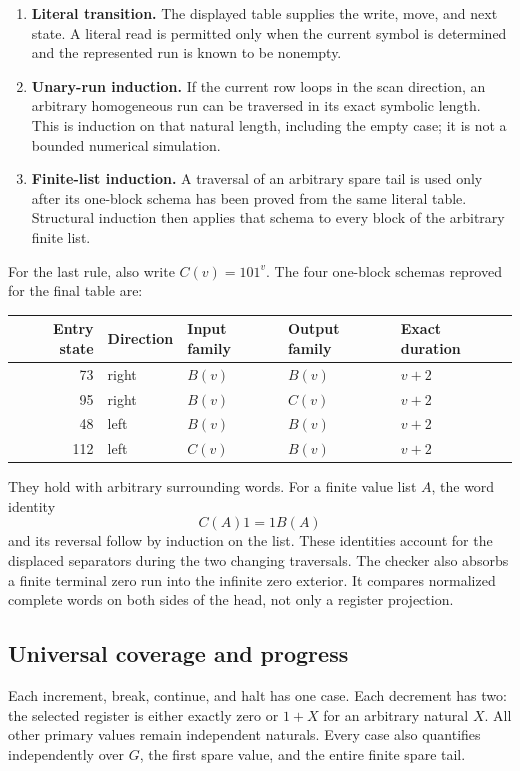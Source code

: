 \begin{enumerate}
\item \textbf{Literal transition.} The displayed table supplies the write,
move, and next state. A literal read is permitted only when the current
symbol is determined and the represented run is known to be nonempty.
\item \textbf{Unary-run induction.} If the current row loops in the scan
direction, an arbitrary homogeneous run can be traversed in its exact
symbolic length. This is induction on that natural length, including the
empty case; it is not a bounded numerical simulation.
\item \textbf{Finite-list induction.} A traversal of an arbitrary spare
tail is used only after its one-block schema has been proved from the
same literal table. Structural induction then applies that schema to
every block of the arbitrary finite list.
\end{enumerate}

For the last rule, also write $C(v)=101^v$. The four one-block schemas
reproved for the final table are:

\begin{center}
\begin{tabular}{rllll}
\toprule
Entry state&Direction&Input family&Output family&Exact duration\\
\midrule
73&right&$B(v)$&$B(v)$&$v+2$\\
95&right&$B(v)$&$C(v)$&$v+2$\\
48&left&$B(v)$&$B(v)$&$v+2$\\
112&left&$C(v)$&$B(v)$&$v+2$\\
\bottomrule
\end{tabular}
\end{center}

They hold with arbitrary surrounding words. For a finite value list $A$,
the word identity
\[
                            C(A)1=1B(A)
\]
and its reversal follow by induction on the list. These identities
account for the displaced separators during the two changing traversals.
The checker also absorbs a finite terminal zero run into the infinite
zero exterior. It compares normalized complete words on both sides of
the head, not only a register projection.

\subsection{Universal coverage and progress}

Each increment, break, continue, and halt has one case. Each decrement
has two: the selected register is either exactly zero or $1+X$ for an
arbitrary natural $X$. All other primary values remain independent
naturals. Every case also quantifies independently over $G$, the first
spare value, and the entire finite spare tail.

